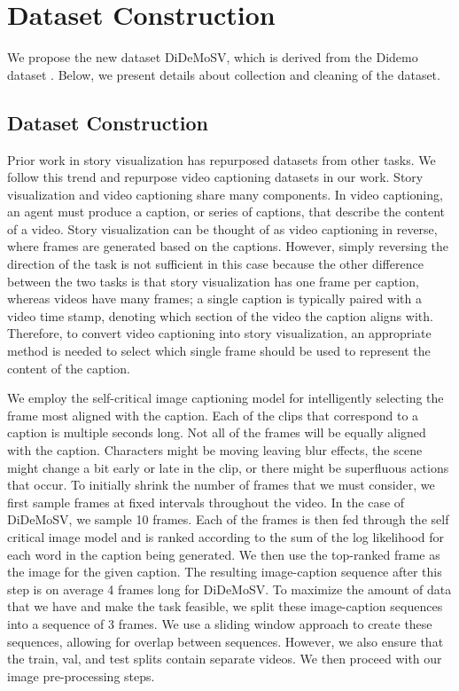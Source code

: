 \documentclass[runningheads]{llncs}
\begin{document}
\section{Dataset Construction} \label{sec:datasets_arxiv}

We propose the new dataset DiDeMoSV, which is derived from the Didemo dataset \cite{hendricks17iccv}. Below, we present details about collection and cleaning of the dataset.

\subsection{Dataset Construction}
Prior work in story visualization has repurposed datasets from other tasks. We follow this trend and repurpose video captioning datasets in our work. Story visualization and video captioning share many components. In video captioning, an agent must produce a caption, or series of captions, that describe the content of a video. Story visualization can be thought of as video captioning in reverse, where frames are generated based on the captions. However, simply reversing the direction of the task is not sufficient in this case because the other difference between the two tasks is that story visualization has one frame per caption, whereas videos have many frames; a single caption is typically paired with a video time stamp, denoting which section of the video the caption aligns with. Therefore, to convert video captioning into story visualization, an appropriate method is needed to select which single frame should be used to represent the content of the caption.


We employ the self-critical image captioning model \cite{rennie2017self} for intelligently selecting the frame most aligned with the caption. Each of the clips that correspond to a caption is multiple seconds long. Not all of the frames will be equally aligned with the caption. Characters might be moving leaving blur effects, the scene might change a bit early or late in the clip, or there might be superfluous actions that occur. To initially shrink the number of frames that we must consider, we first sample frames at fixed intervals throughout the video. In the case of DiDeMoSV, we sample 10 frames. Each of the frames is then fed through the self critical image model and is ranked according to the sum of the log likelihood for each word in the caption being generated. We then use the top-ranked frame as the image for the given caption. The resulting image-caption sequence after this step is on average 4 frames long for DiDeMoSV. To maximize the amount of data that we have and make the task feasible, we split these image-caption sequences into a sequence of 3 frames. We use a sliding window approach to create these sequences, allowing for overlap between sequences. However, we also ensure that the train, val, and test splits contain separate videos. We then proceed with our image pre-processing steps.
\end{document}
